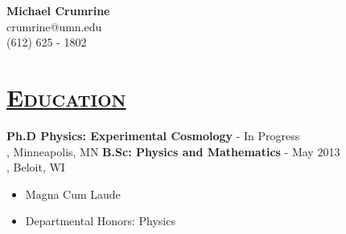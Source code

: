 \documentclass[12pt]{article}
\author{Michael Crumrine}
\begin{document}
 

\nocite{*}

\begin{center}
	\textbf{Michael Crumrine}\\
	crumrine@umn.edu\\
	(612) 625 - 1802
\end{center}

\hrulefill

\section*{\Large{\underline{\textsc{Education}}}}
\vspace{0.05in} 

	{\bf Ph.D Physics: Experimental Cosmology} - In Progress  \\
	, Minneapolis, MN
	\newline
	{\bf B.Sc: Physics and Mathematics} - May 2013  \\
	, Beloit, WI
	\begin{itemize}
			\vspace{-0.3cm}
		\hoffset=20pt\itemsep-0.4em
		\item{Magna Cum Laude}
		\item{Departmental Honors: Physics}
	\end{itemize}
\end{document}
